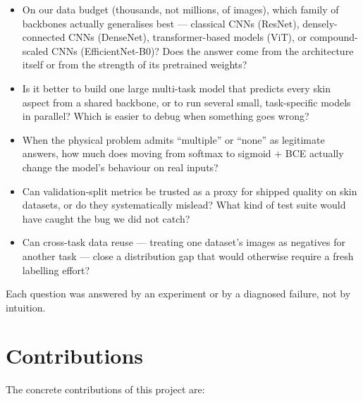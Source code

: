 \documentclass[11pt,a4paper,oneside]{report}
\newcommand{\effnet}{EfficientNet-B0\xspace}
\begin{document}
\begin{itemize}
    \item On our data budget (thousands, not millions, of images),
        which family of backbones actually generalises best ---
        classical CNNs (ResNet), densely-connected CNNs (DenseNet),
        transformer-based models (ViT), or compound-scaled CNNs
        (\effnet)? Does the answer come from the architecture itself
        or from the strength of its pretrained weights?
    \item Is it better to build one large multi-task model that
        predicts every skin aspect from a shared backbone, or to run
        several small, task-specific models in parallel? Which is
        easier to debug when something goes wrong?
    \item When the physical problem admits ``multiple'' or ``none''
        as legitimate answers, how much does moving from softmax to
        sigmoid + BCE actually change the model's behaviour on real
        inputs?
    \item Can validation-split metrics be trusted as a proxy for
        shipped quality on skin datasets, or do they systematically
        mislead? What kind of test suite would have caught the bug
        we did not catch?
    \item Can cross-task data reuse --- treating one dataset's
        images as negatives for another task --- close a
        distribution gap that would otherwise require a fresh
        labelling effort?
\end{itemize}

Each question was answered by an experiment or by a diagnosed
failure, not by intuition.

\section{Contributions}

The concrete contributions of this project are:
\end{document}

